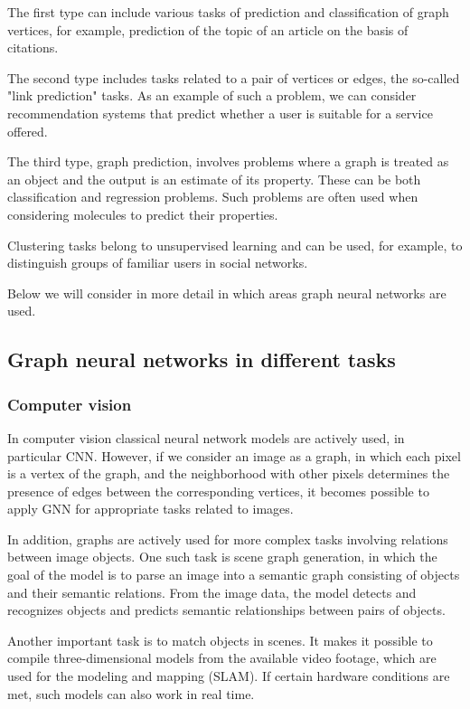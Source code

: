 \documentclass[a4paper,14pt]{article}
\begin{document}
The first type can include various tasks of prediction and classification of graph vertices, for example, prediction of the topic of an article on the basis of citations. 

The second type includes tasks related to a pair of vertices or edges, the so-called "link prediction" tasks. As an example of such a problem, we can consider recommendation systems that predict whether a user is suitable for a service offered. 

The third type, graph prediction, involves problems where a graph is treated as an object and the output is an estimate of its property. These can be both classification and regression problems. Such problems are often used when considering molecules to predict their properties.

Clustering tasks belong to unsupervised learning and can be used, for example, to distinguish groups of familiar users in social networks.

Below we will consider in more detail in which areas graph neural networks are used.

\subsection{Graph neural networks in different tasks}\label{4}

\subsubsection*{Computer vision}

In computer vision classical neural network models are actively used, in particular CNN. However, if we consider an image as a graph, in which each pixel is a vertex of the graph, and the neighborhood with other pixels determines the presence of edges between the corresponding vertices, it becomes possible to apply GNN for appropriate tasks related to images.

In addition, graphs are actively used for more complex tasks involving relations between image objects.
One such task is scene graph generation, in which the goal of the model is to parse an image into a semantic graph consisting of objects and their semantic relations. From the image data, the model detects and recognizes objects and predicts semantic relationships between pairs of objects.

Another important task is to match objects in scenes. It makes it possible to compile three-dimensional models from the available video footage, which are used for the modeling and mapping (SLAM). If certain hardware conditions are met, such models can also work in real time.
\end{document}
